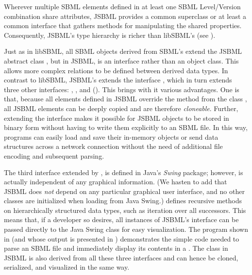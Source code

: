 Wherever multiple SBML elements defined in at least one SBML Level/Version
combination  share attributes, JSBML
 provides a common superclass or at least a
common interface that gathers methods for manipulating the shared
properties. Consequently, JSBML's type hierarchy
 is richer than libSBML's (see
).

Just as in libSBML,  all
SBML objects derived from SBML's \SBase extend the JSBML abstract class
\SBase, but in JSBML, \SBase is an interface rather than an object class.
This allows more complex relations to be defined between derived data
types. In contrast to libSBML, JSBML's \SBase extends the interface
\TreeNodeWithChangeSupport, which in turn extends three other interfaces:
\Cloneable, \Serializable, and \TreeNode ().
This brings with it various advantages. One is that, because all elements
defined in JSBML  override the  method from
the class ,  all JSBML
elements can be deeply copied and are therefore \emph{cloneable}. Further,
extending the interface \Serializable makes it possible for JSBML
 objects to be stored in
binary form without having to write them explicitly to an SBML file.
 In this way, programs can easily load and save their
in-memory objects or send data structures across a network connection
without the need of additional file encoding and subsequent parsing.

The third interface extended by \SBase, \TreeNode is defined in Java's
\emph{Swing}  package; however,
\TreeNode is actually independent of any graphical information.  (We hasten
to add that JSBML does \emph{not} depend on any particular graphical user
interface, and no other classes are initialized when loading \TreeNode from
Java Swing.)  \TreeNode defines recursive methods on hierarchically
structured data types, such as iteration over all successors. This means
that, if a developer so desires, all instances of JSBML's \SBase interface
can be passed directly to the Java Swing  class \JTree {} for easy visualization. The program shown in
 (and whose output is presented in
) demonstrates the simple code
needed to parse an SBML file  and immediately display
its contents in a \JFrame. 
The \ASTNode class in JSBML is also derived from all these three interfaces
and can hence be cloned, serialized, and visualized in the same way.

